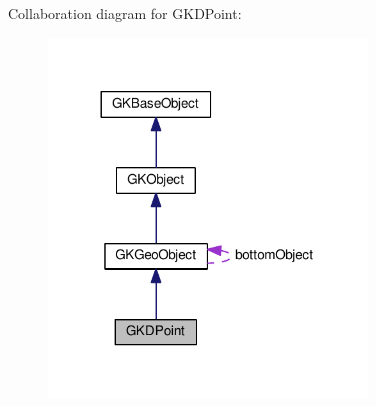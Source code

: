 Collaboration diagram for G\+K\+D\+Point\+:
\nopagebreak
\begin{figure}[H]
\begin{center}
\leavevmode
\includegraphics[width=240pt]{classGKDPoint__coll__graph}
\end{center}
\end{figure}
